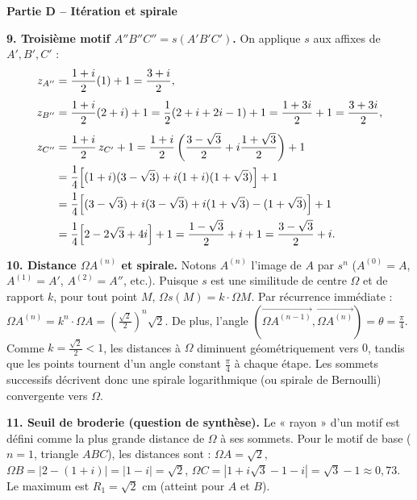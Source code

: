 \documentclass[11pt]{article}
\newcommand{\cle}[1]{{\popxbold\color{popdark}#1}}
\begin{document}
\begin{exoresolu}
\bigskip
\textbf{Partie D -- Itération et spirale}

\textbf{9. Troisième motif $A''B''C'' = s(A'B'C')$.}
On applique $s$ aux affixes de $A', B', C'$ :
\begin{align*}
z_{A''} &= \frac{1+i}{2}(1) + 1 = \frac{3+i}{2},\\[4pt]
z_{B''} &= \frac{1+i}{2}(2+i) + 1 = \frac{1}{2}(2+i+2i-1) + 1 = \frac{1+3i}{2} + 1 = \frac{3+3i}{2},\\[4pt]
z_{C''} &= \frac{1+i}{2}\,z_{C'} + 1 
= \frac{1+i}{2}\left(\frac{3-\sqrt{3}}{2} + i\frac{1+\sqrt{3}}{2}\right) + 1 \\
&= \frac{1}{4}\Bigl[(1+i)(3-\sqrt{3}) + i(1+i)(1+\sqrt{3})\Bigr] + 1 \\
&= \frac{1}{4}\Bigl[ (3-\sqrt{3}) + i(3-\sqrt{3}) + i(1+\sqrt{3}) - (1+\sqrt{3}) \Bigr] + 1 \\
&= \frac{1}{4}\Bigl[ 2 - 2\sqrt{3} + 4i \Bigr] + 1 = \frac{1-\sqrt{3}}{2} + i + 1 = \frac{3-\sqrt{3}}{2} + i.
\end{align*}

\textbf{10. Distance $\Omega A^{(n)}$ et spirale.}
Notons $A^{(n)}$ l'image de $A$ par $s^n$ ($A^{(0)}=A$, $A^{(1)}=A'$, $A^{(2)}=A''$, etc.).
Puisque $s$ est une similitude de centre $\Omega$ et de rapport $k$, pour tout point $M$, $\Omega s(M) = k \cdot \Omega M$.
Par récurrence immédiate : $\Omega A^{(n)} = k^n \cdot \Omega A = \left(\frac{\sqrt{2}}{2}\right)^n \sqrt{2}$.
De plus, l'angle $(\overrightarrow{\Omega A^{(n-1)}}, \overrightarrow{\Omega A^{(n)}}) = \theta = \frac{\pi}{4}$.
Comme $k = \frac{\sqrt{2}}{2} < 1$, les distances à $\Omega$ diminuent géométriquement vers $0$, tandis que les points tournent d'un angle constant $\frac{\pi}{4}$ à chaque étape. Les sommets successifs décrivent donc une \cle{spirale logarithmique} (ou spirale de Bernoulli) convergente vers $\Omega$.

\textbf{11. Seuil de broderie (question de synthèse).}
Le « rayon » d'un motif est défini comme la plus grande distance de $\Omega$ à ses sommets.
Pour le motif de base ($n=1$, triangle $ABC$), les distances sont :
$\Omega A = \sqrt{2}$, $\Omega B = |2-(1+i)| = |1-i| = \sqrt{2}$, $\Omega C = |1+i\sqrt{3}-1-i| = \sqrt{3}-1 \approx 0,73$.
Le maximum est $R_1 = \sqrt{2}$ cm (atteint pour $A$ et $B$).


\end{exoresolu}
\end{document}

